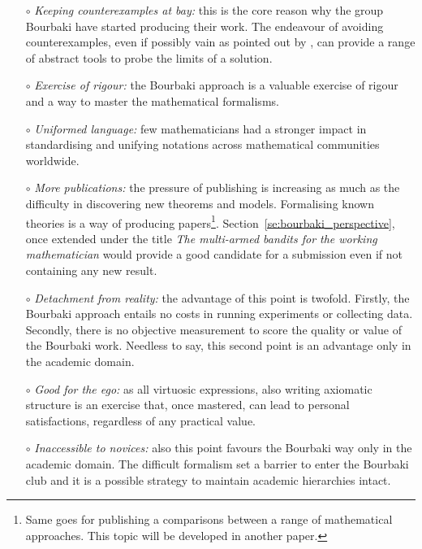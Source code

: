 \documentclass[]{scrartcl}
\theoremstyle{definition}
\begin{document}
\begin{itemize}

    \item[$\circ$] \emph{Keeping counterexamples at bay:} this is the core reason why the group Bourbaki have started producing their work. The endeavour of avoiding counterexamples, even if possibly vain as pointed out by \cite{mathias1992ignorance}, can provide a range of abstract tools to probe the limits of a solution.
     
    \item[$\circ$] \emph{Exercise of rigour:} the Bourbaki approach is a valuable exercise of rigour and a way to master the mathematical formalisms. 
    
    \item[$\circ$] \emph{Uniformed language:} few mathematicians had a stronger impact in standardising and unifying notations across mathematical communities worldwide.

    \item[$\circ$] \emph{More publications:} the pressure of publishing is increasing as much as the difficulty in discovering new theorems and models. Formalising known theories is a way of producing papers\footnote{
        Same goes for publishing a comparisons between a range of mathematical approaches. This topic will be developed in another paper.
    }. Section~\ref{se:bourbaki_perspective}, once extended under the title \emph{The multi-armed bandits for the working mathematician} would provide a good candidate for a submission even if not containing any new result.
    
    \item[$\circ$] \emph{Detachment from reality:} the advantage of this point is twofold. Firstly, the Bourbaki approach entails no costs in running experiments or collecting data. Secondly, there is no objective measurement to score the quality or value of the Bourbaki work. Needless to say, this second point is an advantage only in the academic domain.
    
    \item[$\circ$] \emph{Good for the ego:} as all virtuosic expressions, also writing axiomatic structure is an exercise that, once mastered, can lead to personal satisfactions, regardless of any practical value.
    
    \item[$\circ$] \emph{Inaccessible to novices:} also this point favours the Bourbaki way only in the academic domain. The difficult formalism set a barrier to enter the Bourbaki club and it is a possible strategy to maintain academic hierarchies intact.
    

\end{itemize}
\end{document}
